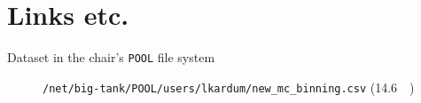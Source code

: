 \section{Links etc.}
\begin{description}
  \item[Dataset in the chair's \texttt{POOL} file system] \texttt{/net/big-tank/POOL/users/lkardum/new\_mc\_binning.csv} (\SI{14.6}{\giga\byte})
\end{description}
